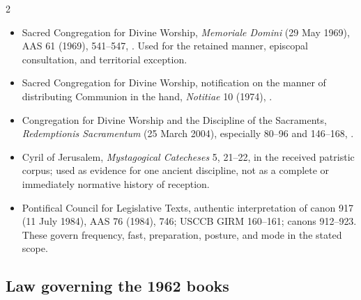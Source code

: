 \begin{multicols}{2}
\begin{itemize}[itemsep=0.12em,topsep=0.15em]
\item Sacred Congregation for Divine Worship, \emph{Memoriale Domini} (29 May 1969), AAS 61 (1969), 541--547, . Used for the retained manner, episcopal consultation, and territorial exception.
\item Sacred Congregation for Divine Worship, notification on the manner of distributing Communion in the hand, \emph{Notitiae} 10 (1974), .
\item Congregation for Divine Worship and the Discipline of the Sacraments, \emph{Redemptionis Sacramentum} (25 March 2004), especially 80--96 and 146--168, .
\item Cyril of Jerusalem, \emph{Mystagogical Catecheses} 5, 21--22, in the received patristic corpus; used as evidence for one ancient discipline, not as a complete or immediately normative history of reception.
\item Pontifical Council for Legislative Texts, authentic interpretation of canon 917 (11 July 1984), AAS 76 (1984), 746; USCCB GIRM 160--161; canons 912--923. These govern frequency, fast, preparation, posture, and mode in the stated scope.
\end{itemize}

\subsection*{Law governing the 1962 books}


\end{multicols}
